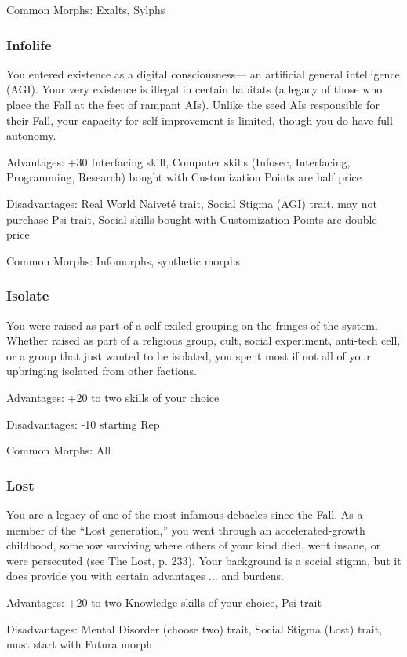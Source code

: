 Common Morphs: Exalts, Sylphs

\subsubsection{Infolife} %
You entered existence as a digital consciousness— an artificial general
intelligence (AGI). Your very existence is illegal in certain habitats (a
legacy of those who place the Fall at the feet of rampant AIs).  Unlike the
seed AIs responsible for their Fall, your capacity for self-improvement is
limited, though you do have full autonomy.
 
Advantages: +30 Interfacing skill, Computer skills (Infosec, Interfacing,
Programming, Research) bought with Customization Points are half price
 
Disadvantages: Real World Naiveté trait, Social Stigma (AGI) trait, may not
purchase Psi trait, Social skills bought with Customization Points are double
price
 
Common Morphs: Infomorphs, synthetic morphs

\subsubsection{Isolate} %
You were raised as part of a self-exiled grouping on the fringes of the
system. Whether raised as part of a religious group, cult, social experiment,
anti-tech cell, or a group that just wanted to be isolated, you spent most if
not all of your upbringing isolated from other factions.
 
Advantages: +20 to two skills of your choice
 
Disadvantages: -10 starting Rep
 
Common Morphs: All

\subsubsection{Lost} %
You are a legacy of one of the most infamous debacles since the Fall. As a
member of the “Lost generation,” you went through an accelerated-growth
childhood, somehow surviving where others of your kind died, went insane, or
were persecuted (see The Lost, p. 233).  Your background is a social stigma,
but it does provide you with certain advantages ... and burdens.
 
Advantages: +20 to two Knowledge skills of your choice, Psi trait
 
Disadvantages: Mental Disorder (choose two) trait, Social Stigma (Lost) trait,
must start with Futura morph

